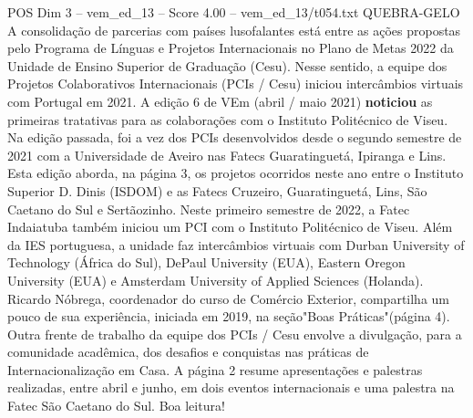 \begin{textsample}{POS Dim 3 – vem\_ed\_13 – Score 4.00 – vem\_ed\_13/t054.txt}  \label{ex:f3_pos_130}
QUEBRA-GELO A consolidação de parcerias com países lusofalantes está entre as ações propostas pelo Programa de Línguas e Projetos Internacionais no Plano de Metas 2022 da Unidade de Ensino Superior de Graduação (Cesu).
Nesse sentido, a equipe dos Projetos Colaborativos Internacionais (PCIs / Cesu) iniciou intercâmbios virtuais com Portugal em 2021.
A edição 6 de VEm (abril / maio 2021) \textbf{noticiou} as primeiras tratativas para as colaborações com o Instituto Politécnico de Viseu.
Na edição passada, foi a vez dos PCIs desenvolvidos desde o segundo semestre de 2021 com a Universidade de Aveiro nas Fatecs Guaratinguetá, Ipiranga e Lins.
Esta edição aborda, na página 3, os projetos ocorridos neste ano entre o Instituto Superior D.
Dinis (ISDOM) e as Fatecs Cruzeiro, Guaratinguetá, Lins, São Caetano do Sul e Sertãozinho.
Neste primeiro semestre de 2022, a Fatec Indaiatuba também iniciou um PCI com o Instituto Politécnico de Viseu.
Além da IES portuguesa, a unidade faz intercâmbios virtuais com Durban University of Technology (África do Sul), DePaul University (EUA), Eastern Oregon University (EUA) e Amsterdam University of Applied Sciences (Holanda).
Ricardo Nóbrega, coordenador do curso de Comércio Exterior, compartilha um pouco de sua experiência, iniciada em 2019, na seção"Boas Práticas"(página 4).
Outra frente de trabalho da equipe dos PCIs / Cesu envolve a divulgação, para a comunidade acadêmica, dos desafios e conquistas nas práticas de Internacionalização em Casa.
A página 2 resume apresentações e palestras realizadas, entre abril e junho, em dois eventos internacionais e uma palestra na Fatec São Caetano do Sul.
Boa leitura!

\end{textsample}
